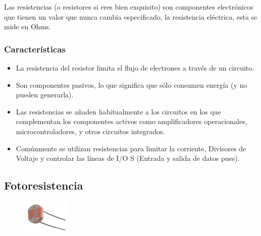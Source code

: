 \documentclass[12pt, fleqn]{article}                            %
\theoremstyle{break}                                            %
\begin{document}
            Las resistencias (o resistores si eres bien exquisito) son componentes electrónicos
            que tienen un valor que nunca cambia especificado, la resistencia eléctrica,
            esta se mide en Ohms.

        \subsubsection{Características}

            \begin{itemize}
                \item La resistencia del resistor limita el flujo de electrones a
                    través de un circuito.

                \item Son componentes pasivos, lo que significa que sólo consumen energía 
                (y no pueden generarla).

                \item Las resistencias se añaden habitualmente a los circuitos en los que
                complementan los componentes activos como amplificadores operacionales,
                microcontroladores, y otros circuitos integrados.

                \item  Comúnmente se utilizan resistencias para limitar la corriente,
                Divisores de Voltaje y controlar las líneas de I/O S (Entrada y salida
                de datos pues).
            \end{itemize}



    \vspace{1em}
    \subsection{Fotoresistencia}

        \begin{figure}
            \centering
            \includegraphics[width=0.20\textwidth]{LDR}
        \end{figure}
\end{document}
